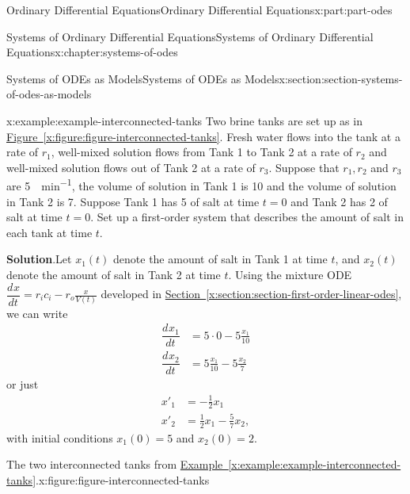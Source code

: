 \documentclass[oneside,10pt,]{book}
\newcommand{\blocktitlefont}{\relax}
\newcommand{\xreffont}{\relax}
\numberwithin{equation}{part}
\newcommand{\dv}[3][]{\dfrac{d^{#1} #2}{d #3^{#1}}}
\newcommand{\amp}{&}
\begin{document}
\begin{partptx}{Ordinary Differential Equations}{}{Ordinary Differential Equations}{}{}{x:part:part-odes}
\begin{chapterptx}{Systems of Ordinary Differential Equations}{}{Systems of Ordinary Differential Equations}{}{}{x:chapter:systems-of-odes}
\begin{sectionptx}{Systems of ODEs as Models}{}{Systems of ODEs as Models}{}{}{x:section:section-systems-of-odes-as-models}
\begin{example}{}{x:example:example-interconnected-tanks}
Two brine tanks are set up as in \hyperref[x:figure:figure-interconnected-tanks]{Figure~{\xreffont\ref{x:figure:figure-interconnected-tanks}}}. Fresh water flows into the tank at a rate of \(r_{1}\), well-mixed solution flows from Tank 1 to Tank 2 at a rate of \(r_{2}\) and well-mixed solution flows out of Tank 2 at a rate of \(r_{3}\). Suppose that \(r_{1}, r_{2}\) and  \(r_{3}\) are \SI{5}{\gallon\per\minute}, the volume of solution in Tank 1 is \SI{10}{\gallon} and the volume of solution in Tank 2 is \SI{7}{\gallon}. Suppose Tank 1 has \SI{5}{\pound} of salt at time \(t=0\) and Tank 2 has \SI{2}{\pound} of salt at time \(t=0\). Set up a first-order system that describes the amount of salt in each tank at time \(t\).%
\par\smallskip%
\noindent\textbf{\blocktitlefont Solution}.\hypertarget{g:solution:idp105548779756704}{}\quad{}Let \(x_{1}(t)\) denote the amount of salt in Tank 1 at time \(t\), and \(x_{2}(t)\) denote the amount of salt in Tank 2 at time \(t\). Using the mixture ODE \(\dv{x}{t} = r_{i}c_{i}-r_{o}\frac{x}{V(t)}\) developed in \hyperref[x:section:section-first-order-linear-odes]{Section~{\xreffont\ref{x:section:section-first-order-linear-odes}}}, we can write%
\begin{align*}
\dv{x_{1}}{t} \amp= 5\cdot0 - 5\frac{x_{1}}{10}\\
\dv{x_{2}}{t} \amp= 5\frac{x_{1}}{10}-5\frac{x_{2}}{7}
\end{align*}
or just%
\begin{align*}
x'_{1}  \amp=  -\frac{1}{2}x_{1}\\
x'_{2}  \amp=  \frac{1}{2}x_{1}-\frac{5}{7}x_{2},
\end{align*}
with initial conditions \(x_{1}(0) = 5\) and \(x_{2}(0) = 2\).%
\end{example}
\begin{figureptx}{The two interconnected tanks from \hyperref[x:example:example-interconnected-tanks]{Example~{\xreffont\ref{x:example:example-interconnected-tanks}}}.}{x:figure:figure-interconnected-tanks}{}%
\begin{image}{0}{1}{0}%
\end{image}
\end{figureptx}
\end{sectionptx}
\end{chapterptx}
\end{partptx}
\end{document}

